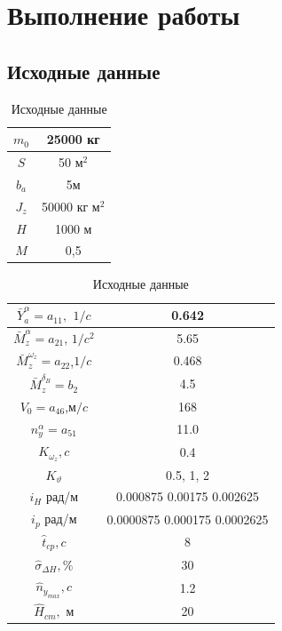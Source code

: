 \documentclass[a4paper,12pt]{article}
\begin{document}
\section{Выполнение работы}
    \subsection{Исходные данные}

    \begin{table}[H]
        \centering
        \caption{Исходные данные}
        \label{tab:Исходные данные 1}
        \begin{tabular}{|c|c|}
        \hline
            $m_0$ & 25000 кг  \\ \hline
            $S$ & 50 м$^2$ \\ \hline
            $b_a$ & 5м  \\ \hline
            $J_z$ & 50000 кг м$^2$ \\ \hline
            $H$ & 1000 м  \\ \hline
            $M$ & 0,5  \\ \hline
        \end{tabular}
    \end{table}
                                
    \begin{table}[H]
        \centering
        \caption{Исходные данные}
        \label{tab:Исходные данные 2}
        \begin{tabular}{|c|c|}
            \hline
            $\bar{Y}_a^\alpha=a_{11},$ $1/c$ &  0.642  \\ \hline
            $\bar{M}_z^{\alpha}=a_{21}$, $1/c^2$ &   5.65 \\ \hline
            $\bar{M}_z^{\omega_z}=a_{22}$,$1/c$ &  0.468 \\ \hline
            $\bar{M}^{\delta_B}_z=b_2$ & 4.5  \\ \hline
            $V_0=a_{46}$,м$/c$ & 168 \\ \hline
            $n_y^\alpha=a_{51}$ &  11.0  \\ \hline
            $K_{\omega_z}, c$ & 0.4 \\ \hline
            $K_\vartheta$  & 0.5, 1, 2  \\ \hline
            $i_H$ рад/м & 0.000875 0.00175 0.002625 \\ \hline
            $i_p$ рад/м & 0.0000875 0.000175 0.0002625 \\ \hline
            $\hat{t}_{cp},c$ & 8 \\ \hline
            $\hat{\sigma}_{\Delta H}, \%$ & 30 \\ \hline
            $\hat{n}_{y_{max}},c$ & 1.2 \\ \hline
            $\hat{H}_{cm},$ м & 20 \\ \hline
            \end{tabular}
    \end{table}
\end{document}
